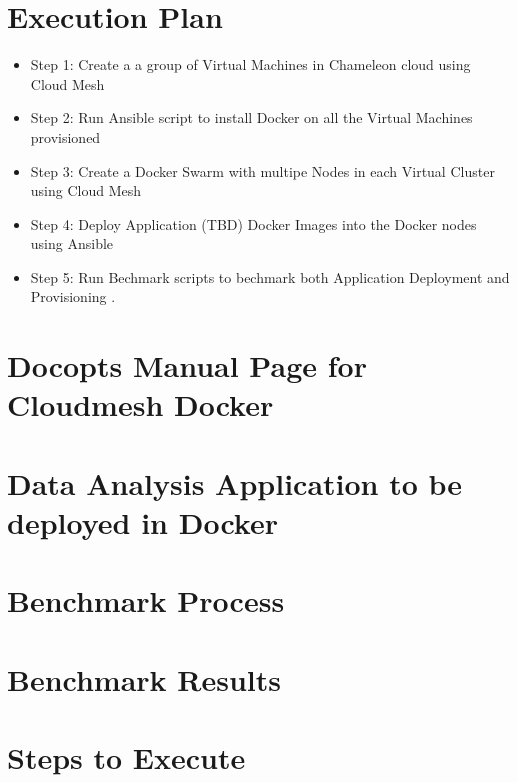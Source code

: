 \documentclass[9pt,twocolumn,twoside]{../../styles/osajnl}
\begin{document}
\section{Execution Plan}

\begin{itemize}
\item Step 1: Create a a group of Virtual Machines in Chameleon cloud using Cloud Mesh
 
\item Step 2: Run Ansible script to install Docker on all the Virtual Machines provisioned

\item Step 3: Create a Docker Swarm with multipe Nodes in each Virtual Cluster using Cloud Mesh

\item Step 4: Deploy Application (TBD) Docker Images into the Docker nodes using Ansible

\item Step 5: Run Bechmark scripts to bechmark both Application Deployment and Provisioning .

\end{itemize}

\section{Docopts Manual Page for Cloudmesh Docker}


\section{Data Analysis Application to be deployed in Docker}


\section{Benchmark Process}


\section{Benchmark Results}


\section{Steps to Execute}




\cite{www-i524}


 


\newpage

\appendix
\end{document}
